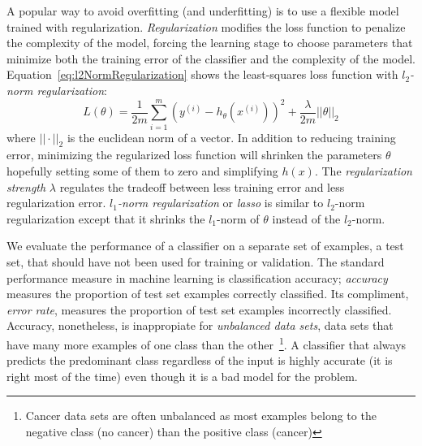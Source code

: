 A popular way to avoid overfitting (and underfitting) is to use a flexible model trained with regularization. \emph{Regularization} modifies the loss function to penalize the complexity of the model, forcing the learning stage to choose parameters that minimize both the training error of the classifier and the complexity of the model. Equation~\ref{eq:l2NormRegularization} shows the least-squares loss function with \emph{$l_2$-norm regularization}:
\begin{equation}
	L(\theta) =  \frac{1}{2m}\sum_{i=1}^m(y^{(i)} - h_\theta(x^{(i)}))^2 + \frac{\lambda}{2m} ||\theta||_2
	\label{eq:l2NormRegularization}
\end{equation}
where $||\cdot||_2$ is the euclidean norm of a vector. In addition to reducing training error, minimizing the regularized loss function will shrinken the parameters $\theta$ hopefully setting some of them to zero and simplifying $h(x)$. The \emph{regularization strength} $\lambda$ regulates the tradeoff between less training error and less regularization error. \emph{$l_1$-norm regularization} or \emph{lasso} is similar to $l_2$-norm regularization except that it shrinks the $l_1$-norm of $\theta$ instead of the $l_2$-norm.

We evaluate the performance of a classifier on a separate set of examples, a test set, that should have not been used for training or validation. The standard performance measure in machine learning is classification accuracy; \emph{accuracy} measures the proportion of test set examples correctly classified. Its compliment, \emph{error rate}, measures the proportion of test set examples incorrectly classified. Accuracy, nonetheless, is inappropiate for \emph{unbalanced data sets}, data sets that have many more examples of one class than the other~\footnote{Cancer data sets are often unbalanced as most examples belong to the negative class (no cancer) than the positive class (cancer)}. A classifier that always predicts the predominant class regardless of the input is highly accurate (it is right most of the time) even though it is a bad model for the problem.

